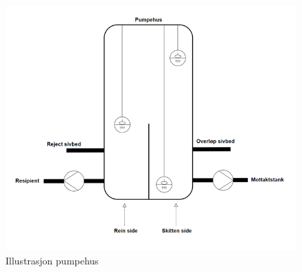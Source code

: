 \begin{figure}[htbp]
    \centering
    \includegraphics[width=1\textwidth]{Figurar/Pumpehus.png}
    \caption{Illustrasjon pumpehus}\label{fig:HMI}
\end{figure}

\newpage



